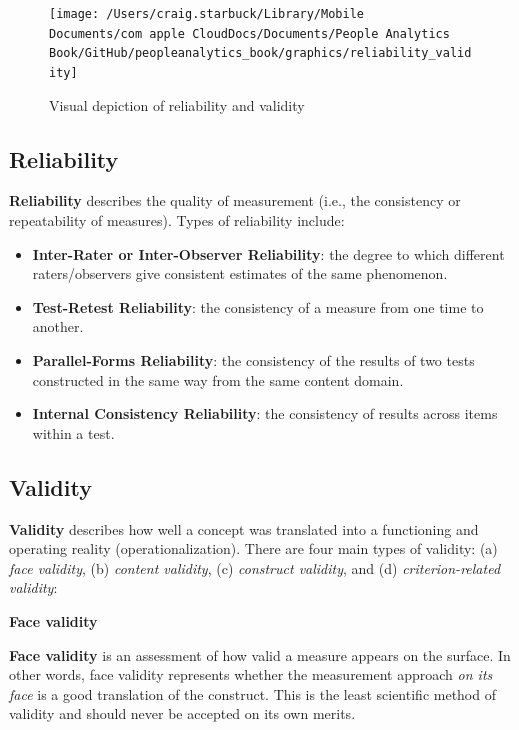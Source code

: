 \documentclass[
]{book}
\providecommand{\tightlist}{%
  \setlength{\itemsep}{0pt}\setlength{\parskip}{0pt}}
\begin{document}
\begin{figure}

{\centering \texttt{[image: /Users/craig.starbuck/Library/Mobile Documents/com~apple~CloudDocs/Documents/People Analytics Book/GitHub/peopleanalytics\_book/graphics/reliability\_validity]} 

}

\caption{Visual depiction of reliability and validity}\label{fig:reli-vali}
\end{figure}

\hypertarget{reliability}{%
\subsection{Reliability}\label{reliability}}

\textbf{Reliability} describes the quality of measurement (i.e., the consistency or repeatability of measures). Types of reliability include:

\begin{itemize}
\tightlist
\item
  \textbf{Inter-Rater or Inter-Observer Reliability}: the degree to which different raters/observers give consistent estimates of the same phenomenon.
\item
  \textbf{Test-Retest Reliability}: the consistency of a measure from one time to another.
\item
  \textbf{Parallel-Forms Reliability}: the consistency of the results of two tests constructed in the same way from the same content domain.
\item
  \textbf{Internal Consistency Reliability}: the consistency of results across items within a test.
\end{itemize}

\hypertarget{validity}{%
\subsection{Validity}\label{validity}}

\textbf{Validity} describes how well a concept was translated into a functioning and operating reality (operationalization). There are four main types of validity: (a) \emph{face validity}, (b) \emph{content validity}, (c) \emph{construct validity}, and (d) \emph{criterion-related validity}:

\textbf{Face validity}

\textbf{Face validity} is an assessment of how valid a measure appears on the surface. In other words, face validity represents whether the measurement approach \emph{on its face} is a good translation of the construct. This is the least scientific method of validity and should never be accepted on its own merits.
\end{document}
